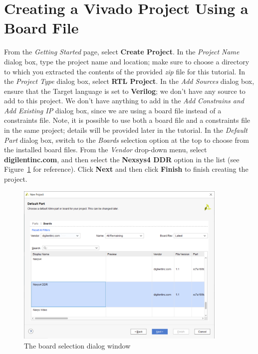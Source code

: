 \documentclass[11pt]{article}
\begin{document}
\section{Creating a Vivado Project Using a Board File}
\label{sec:create_proj}
From the \textit{Getting Started} page, select \textbf{Create Project}. In the \textit{Project Name} dialog box, type the project name and location; make sure to choose a directory to which you extracted the contents of the provided \textit{zip} file for this tutorial. In the \textit{Project Type} dialog box, select \textbf{RTL Project}. In the \textit{Add Sources} dialog box, ensure that the Target language is set to \textbf{Verilog}; we don't have any source to add to this project. We don't have anything to add in the \textit{Add Constrains and Add Existing IP} dialog box, since we are using a board file instead of a constraints file. Note, it is possible to use both a board file and a constraints file in the same project; details will be provided later in the tutorial. In the \textit{Default Part} dialog box, switch to the \textit{Boards} selection option at the top to choose from the installed board files. From the \textit{Vendor} drop-down menu, select \textbf{digilentinc.com}, and then select the \textbf{Nexsys4 DDR} option in the list (see Figure~\ref{fig:board_select} for reference). Click \textbf{Next} and then click \textbf{Finish} to finish creating the project.

\begin{figure}[!h]
    \centering
    \includegraphics[width=0.9\textwidth]{images/board_select.png}
    \caption{The board selection dialog window}
    \label{fig:board_select}
\end{figure}
\end{document}
